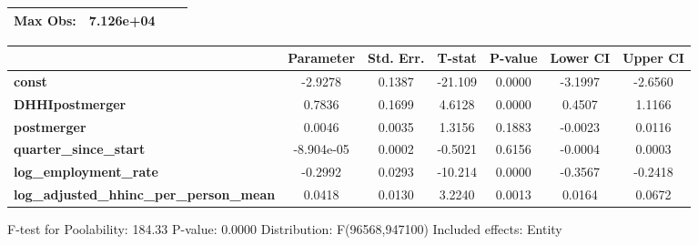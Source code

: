 \documentclass{report}
\begin{document}
\begin{center}
\begin{tabular}{lclc}
\textbf{Max Obs:}                                &      7.126e+04       & \textbf{                     }   &                  \\
\bottomrule
\end{tabular}
\begin{tabular}{lcccccc}
                                                 & \textbf{Parameter} & \textbf{Std. Err.} & \textbf{T-stat} & \textbf{P-value} & \textbf{Lower CI} & \textbf{Upper CI}  \\
\midrule
\textbf{const}                                   &      -2.9278       &       0.1387       &     -21.109     &      0.0000      &      -3.1997      &      -2.6560       \\
\textbf{DHHIpostmerger}                          &       0.7836       &       0.1699       &      4.6128     &      0.0000      &       0.4507      &       1.1166       \\
\textbf{postmerger}                              &       0.0046       &       0.0035       &      1.3156     &      0.1883      &      -0.0023      &       0.0116       \\
\textbf{quarter\_since\_start}                   &     -8.904e-05     &       0.0002       &     -0.5021     &      0.6156      &      -0.0004      &       0.0003       \\
\textbf{log\_employment\_rate}                   &      -0.2992       &       0.0293       &     -10.214     &      0.0000      &      -0.3567      &      -0.2418       \\
\textbf{log\_adjusted\_hhinc\_per\_person\_mean} &       0.0418       &       0.0130       &      3.2240     &      0.0013      &       0.0164      &       0.0672       \\
\bottomrule
\end{tabular}
\end{center}

F-test for Poolability: 184.33 \newline
 P-value: 0.0000 \newline
 Distribution: F(96568,947100) \newline
  \newline
 Included effects: Entity
\end{document}
